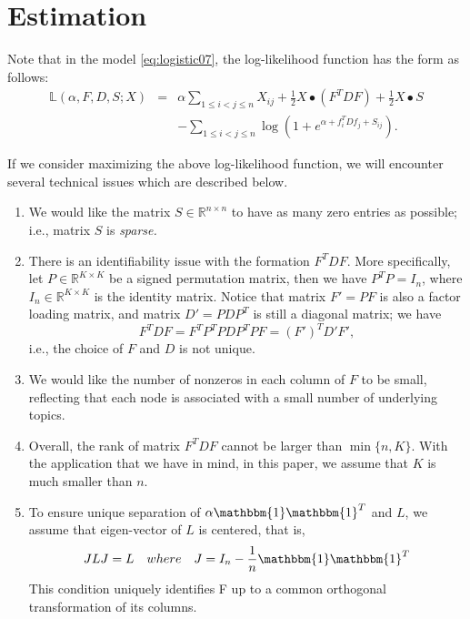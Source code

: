 \documentclass{article}
\begin{document}
\section{Estimation}
\label{sec:estimate}


Note that in the model \eqref{eq:logistic07}, the log-likelihood function has the form as follows:
\begin{eqnarray}
\label{eq:logistic08}
\mathbb{L}(\alpha,  F, D, S; X)
&=& \alpha \sum_{1\le i< j\le n}X_{ij} +\frac{1}{2} X \bullet (F^T D F) +\frac{1}{2} X \bullet S \\
&& -\sum_{1\le i<j\le n} \log \left(1 + e^{\alpha + f_i^T D f_j +S_{ij} }\right). \nonumber
\end{eqnarray}

If we consider maximizing the above log-likelihood function,
we will encounter several technical issues which are described below.
\begin{enumerate}
\item We would like the matrix $S \in \mathbb{R}^{n \times n}$ to have as many zero entries as possible; i.e., matrix $S$ is {\it sparse.}

\item There is an identifiability issue with the formation $F^T D F$.
More specifically, let $P \in \mathbb{R}^{K \times K}$ be a signed permutation matrix, then we have $P^T P = I_n$, where $I_n \in \mathbb{R}^{K \times K}$ is the identity matrix.
Notice that matrix $F' = PF$ is also a factor loading matrix, and
matrix $D' = P D P^T$ is still a diagonal matrix;
we have
$$
F^T D F = F^T P^T P D P^T P F = (F')^T D' F',
$$
i.e., the choice of $F$ and $D$ is not unique.

\item We would like the number of nonzeros in each column of $F$ to be small, reflecting that each node is associated with a small number of underlying topics.

\item Overall, the rank of matrix $F^T D F$ cannot be larger than $\min\{n,K\}$.
With the application that we have in mind, in this paper, we assume that $K$ is much smaller than $n$.

\item To ensure unique separation of $\alpha\mathbbm{1}\mathbbm{1}^T$ and $L$, we assume that eigen-vector of $L$ is centered, that is,
\[
    JLJ = L \quad where \quad
    J=I_{n}-\frac{1}{n}\mathbbm{1}\mathbbm{1}^T
\]
This condition uniquely identifies F up to a common orthogonal transformation of its columns.

\end{enumerate}
\end{document}
